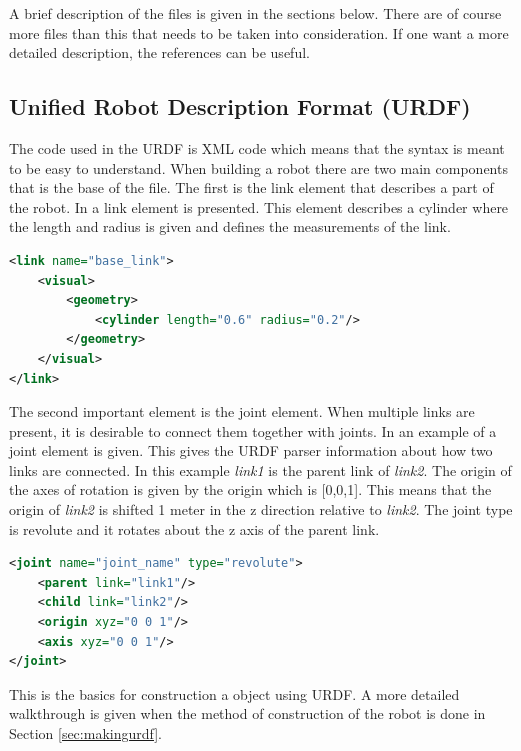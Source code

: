 A brief description of the files is given in the sections below. There are of course more files than this that needs to be taken into consideration. If one want a more detailed description, the references \cite{ROSWiki,GazeboURDF,XMLdoc,YAMLdoc} can be useful.

\subsection{Unified Robot Description Format (URDF)}\label{sec:basicURDF}
The code used in the URDF is XML code which means that the syntax is meant to be easy to understand\cite{XMLdoc}. When building a robot there are two main components that is the base of the file. The first is the link element that describes a part of the robot. In  a link element is presented. This element describes a cylinder where the length and radius is given and defines the measurements of the link. 

\begin{lstlisting}[language=xml,caption={URDF code example of a link element},label={lst:example}]
<link name="base_link">
    <visual>
        <geometry>
            <cylinder length="0.6" radius="0.2"/>
        </geometry>
    </visual>
</link>
\end{lstlisting}

The second important element is the joint element. When multiple links are present, it is desirable to connect them together with joints. In  an example of a joint element is given. This gives the URDF parser information about how two links are connected. In this example \textit{link1} is the parent link of \textit{link2}. The origin of the axes of rotation is given by the origin which is [0,0,1]. This means that the origin of \textit{link2} is shifted 1 meter in the z direction relative to \textit{link2}. The joint type is revolute and it rotates about the z axis of the parent link. 

\begin{lstlisting}[language=xml,caption={URDF code example of a joint element},label={lst:jointexample}]
<joint name="joint_name" type="revolute">
    <parent link="link1"/>
    <child link="link2"/>
    <origin xyz="0 0 1"/>
    <axis xyz="0 0 1"/>
</joint>
\end{lstlisting}

This is the basics for construction a object using URDF. A more detailed walkthrough is given when the method of construction of the robot is done in Section \ref{sec:makingurdf}\cite{ROSWiki}.



